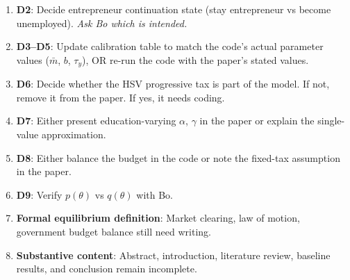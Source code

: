 \documentclass[11pt]{article}
\begin{document}
\begin{enumerate}
    \item \textbf{D2}: Decide entrepreneur continuation state (stay entrepreneur vs become unemployed). \textit{Ask Bo which is intended.}
    \item \textbf{D3--D5}: Update calibration table to match the code's actual parameter values ($\bar{m}$, $b$, $\tau_y$), OR re-run the code with the paper's stated values.
    \item \textbf{D6}: Decide whether the HSV progressive tax is part of the model. If not, remove it from the paper. If yes, it needs coding.
    \item \textbf{D7}: Either present education-varying $\alpha$, $\gamma$ in the paper or explain the single-value approximation.
    \item \textbf{D8}: Either balance the budget in the code or note the fixed-tax assumption in the paper.
    \item \textbf{D9}: Verify $p(\theta)$ vs $q(\theta)$ with Bo.
    \item \textbf{Formal equilibrium definition}: Market clearing, law of motion, government budget balance still need writing.
    \item \textbf{Substantive content}: Abstract, introduction, literature review, baseline results, and conclusion remain incomplete.
\end{enumerate}
\end{document}
